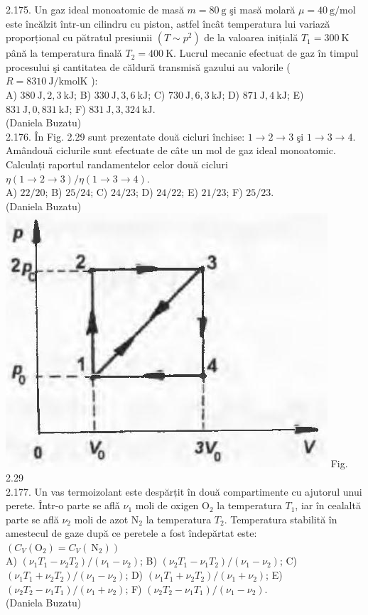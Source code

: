 2.175. Un gaz ideal monoatomic de masă $m=80 \mathrm{~g}$ şi masă molară $\mu=40 \mathrm{~g} / \mathrm{mol}$ este încălzit într-un cilindru cu piston, astfel încât temperatura lui variază proporțional cu pătratul presiunii $\left(T \sim p^{2}\right)$ de la valoarea inițială $T_{1}=300 \mathrm{~K}$ până la temperatura finalǎ $T_{2}=400 \mathrm{~K}$. Lucrul mecanic efectuat de gaz în timpul procesului şi cantitatea de căldură transmisă gazului au valorile ( $R=8310 \mathrm{~J} / \mathrm{kmol} \mathrm{K}$ ):\\ A) $380 \mathrm{~J} , 2,3 \mathrm{~kJ}$; B) $330 \mathrm{~J} , 3,6 \mathrm{~kJ}$; C) $730 \mathrm{~J} , 6,3 \mathrm{~kJ}$; D) $871 \mathrm{~J} , 4 \mathrm{~kJ}$; E) $831 \mathrm{~J} , 0,831 \mathrm{~kJ}$; F) $831 \mathrm{~J} , 3,324 \mathrm{~kJ}$.\\ (Daniela Buzatu)\\

2.176. În Fig. 2.29 sunt prezentate două cicluri închise: $1 \rightarrow 2 \rightarrow 3$ şi $1 \rightarrow 3 \rightarrow 4$. Amândouă ciclurile sunt efectuate de câte un mol de gaz ideal monoatomic. Calculați raportul randamentelor celor două cicluri $\eta(1 \rightarrow 2 \rightarrow 3) / \eta(1 \rightarrow 3 \rightarrow 4)$.\\ A) $22 / 20$; B) $25 / 24$; C) $24 / 23$; D) $24 / 22$; E) $21 / 23$; F) $25 / 23$.\\ (Daniela Buzatu)\\ \includegraphics[width=0.4\linewidth]{images/2025_07_01_5b3ff9fa0d508c8e9f17g-113} Fig. 2.29\\

2.177. Un vas termoizolant este despărțit în două compartimente cu ajutorul unui perete. Într-o parte se aflǎ $\nu_{1}$ moli de oxigen $\mathrm{O}_{2}$ la temperatura $T_{1}$, iar în cealaltă parte se află $\nu_{2}$ moli de azot $\mathrm{N}_{2}$ la temperatura $T_{2}$. Temperatura stabilită în amestecul de gaze după ce peretele a fost îndepărtat este: $\left(C_{V}\left(\mathrm{O}_{2}\right)=C_{V}\left(\mathrm{~N}_{2}\right)\right)$\\ A) $\left(\nu_{1} T_{1}-\nu_{2} T_{2}\right) /\left(\nu_{1}-\nu_{2}\right)$; B) $\left(\nu_{2} T_{1}-\nu_{1} T_{2}\right) /\left(\nu_{1}-\nu_{2}\right)$; C) $\left(\nu_{1} T_{1}+\nu_{2} T_{2}\right) /\left(\nu_{1}-\nu_{2}\right)$; D) $\left(\nu_{1} T_{1}+\nu_{2} T_{2}\right) /\left(\nu_{1}+\nu_{2}\right)$; E) $\left(\nu_{2} T_{2}-\nu_{1} T_{1}\right) /\left(\nu_{1}+\nu_{2}\right)$; F) $\left(\nu_{2} T_{2}-\nu_{1} T_{1}\right) /\left(\nu_{1}-\nu_{2}\right)$.\\ (Daniela Buzatu)\\

